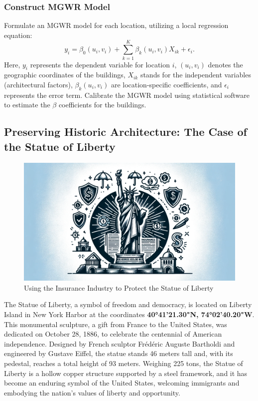 \documentclass[12pt]{article}
\begin{document}
\subsubsection{Construct MGWR Model}
Formulate an MGWR model for each location, utilizing a local regression equation:
\begin{equation}
    y_i = \beta_0(u_i, v_i) + \sum_{k=1}^{K} \beta_k(u_i, v_i)X_{ik} + \epsilon_i.
\end{equation}
Here, $y_i$ represents the dependent variable for location $i$, $(u_i, v_i)$ denotes the geographic coordinates of the buildings, $X_{ik}$ stands for the independent variables (architectural factors), $\beta_k(u_i, v_i)$ are location-specific coefficients, and $\epsilon_i$ represents the error term.
Calibrate the MGWR model using statistical software to estimate the $\beta$ coefficients for the buildings.

\subsection{Preserving Historic Architecture: The Case of the Statue of Liberty}
\begin{figure}[htbp]
    \centering
    \includegraphics[width=0.8\linewidth]{figure/111.png}
    \caption{Using the Insurance Industry to Protect the Statue of Liberty}
\end{figure}

The Statue of Liberty, a symbol of freedom and democracy, is located on Liberty Island in New York Harbor at the coordinates \textbf{40°41'21.30"N, 74°02'40.20"W}. This monumental sculpture, a gift from France to the United States, was dedicated on October 28, 1886, to celebrate the centennial of American independence. Designed by French sculptor Frédéric Auguste Bartholdi and engineered by Gustave Eiffel, the statue stands 46 meters tall and, with its pedestal, reaches a total height of 93 meters. Weighing 225 tons, the Statue of Liberty is a hollow copper structure supported by a steel framework, and it has become an enduring symbol of the United States, welcoming immigrants and embodying the nation's values of liberty and opportunity.
\end{document}
